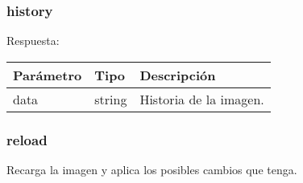 		
		\pagebreak
			\subsubsection{history}
				Respuesta:
				
				\begin{table}[h!]
					\centering
	\begin{adjustbox}{max width=\textwidth}
					\begin{tabular}{|l|l|l|}
						\hline
						Parámetro & Tipo & Descripción \\ \hline
						data & string & Historia de la imagen. \\ \hline
					\end{tabular}
\end{adjustbox}
				\end{table}
			
			\subsubsection{reload}
				Recarga la imagen y aplica los posibles cambios que tenga.
		
		
	



